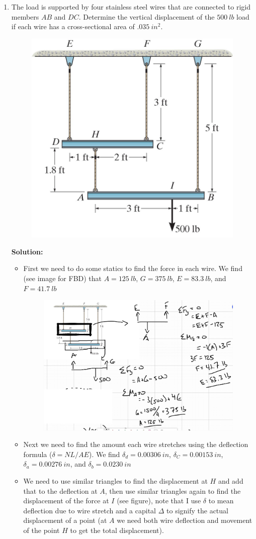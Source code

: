 \documentclass[12pt, oneside]{article}
\let\US\SI
\begin{document}
\begin{enumerate}
	\item %
		The load is supported by four stainless steel wires that are connected to rigid members $AB$ and $DC$.
		Determine the vertical displacement of the $\US{500}{lb}$ load if each wire has a cross-sectional area of $\US{.035}{in^2}$.
		\begin{figure}[H]
			\centering
			\includegraphics[width=0.5\linewidth]{4-11}
		\end{figure}
		\textbf{Solution:}
		\begin{itemize}
		\item First we need to do some statics to find the force in each wire.
			We find (see image for FBD) that $A=\US{125}{lb}$, $G=\US{375}{lb}$, $E=\US{83.3}{lb}$, and $F=\US{41.7}{lb}$
			\begin{figure}[H]
				\centering
				\includegraphics[width=0.7\linewidth]{2a}
			\end{figure}
		\item Next we need to find the amount each wire stretches using the deflection formula ($\delta = NL/AE$).
			We find $\delta_d = \US{0.00306}{in}$, $\delta_C = \US{0.00153}{in}$, $\delta_a = \US{0.00276}{in}$, and $\delta_b = \US{0.0230}{in}$
		\item We need to use similar triangles to find the displacement at $H$ and add that to the deflection at $A$, then use similar triangles again to find the displacement of the force at $I$ (see figure), note that I use $\delta$ to mean deflection due to wire stretch and a capital $\Delta$ to signify the actual displacement of a point (at $A$ we need both wire deflection and movement of the point $H$ to get the total displacement).

\end{itemize}
\end{enumerate}
\end{document}
